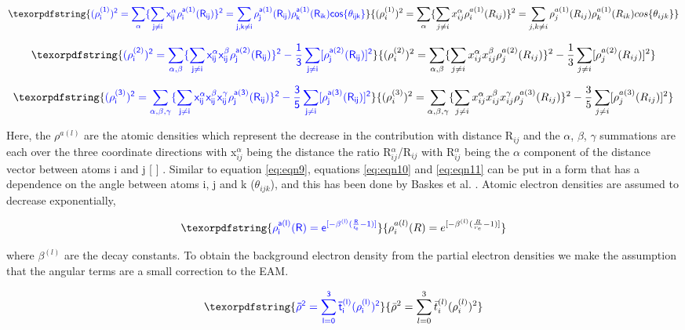 \documentclass[review]{elsarticle}
\providecommand{\DIFaddtex}[1]{{\protect\color{blue} \sf #1}} %
\providecommand{\DIFadd}[1]{\texorpdfstring{\DIFaddtex{#1}}{#1}} %
\begin{document}
\begin{equation}
\DIFadd{\label{eq:eqn9}
(\rho_{i}^{(1)})^{2}=\sum_{\alpha} \{ \sum_{j \neq i}x_{ij}^{\alpha}\rho_{i}^{a(1)}(R_{ij})\}^{2} = \sum_{j,k \neq i}\rho_{j}^{a(1)}(R_{ij})\rho_{k}^{a(1)}(R_{ik})cos\{\theta_{ijk}\}
}\end{equation}

\begin{equation}
\DIFadd{\label{eq:eqn10}
(\rho_{i}^{(2)})^{2}=\sum_{\alpha,\beta}\{\sum_{j \neq i}x_{ij}^{\alpha}x_{ij}^{\beta}\rho_{j}^{a(2)}(R_{ij})\}^{2} - \frac{1}{3}\sum_{j \neq i}[\rho_{j}^{a(2)}(R_{ij})]^2
}\end{equation}

\begin{equation}
\DIFadd{\label{eq:eqn11}
(\rho_{i}^{(3)})^{2}=\sum_{\alpha,\beta,\gamma}\{ \sum_{j \neq i}x_{ij}^{\alpha}x_{ij}^{\beta}x_{ij}^{\gamma}\rho_{j}^{a(3)}(R_{ij}) \}^{2} - \frac{3}{5}\sum_{j \neq i}[\rho_{j}^{a(3)}(R_{ij})]^2
}\end{equation}

\DIFadd{Here, the $\rho^{a(l)}$  are the atomic densities which represent the decrease in the contribution with distance R$_{ij}$ and the $\alpha$, $\beta$, $\gamma$ summations are each over the three coordinate directions with x$_{ij}^{\alpha}$ being the distance the ratio R$_{ij}^{\alpha}$/R$_{ij}$ with R$_{ij}^{\alpha}$ being the $\alpha$ component of the distance vector between atoms i and j }[\DIFadd{29}]\DIFadd{.  Similar to equation \ref{eq:eqn9}, equations \ref{eq:eqn10} and \ref{eq:eqn11} can be put in a form that has a dependence on the angle between atoms i, j and k ($\theta_{ijk}$), and this has been done by Baskes et al. \cite{baskes1989}.  Atomic electron densities are assumed to decrease exponentially, 
}

\begin{equation}
\DIFadd{\label{eq:eqn12}
\rho_{i}^{a(l)}(R) = e^{[-\beta^{(l)}(\frac{R}{r_{e}}-1)]}
}\end{equation}

\DIFadd{where $\beta^{(l)}$ are the decay constants.  To obtain the background electron density from the partial electron densities we make the assumption that the angular terms are a small correction to the EAM.
}

\begin{equation}
\DIFadd{\label{eq:eqn13}
\bar{\rho}^{2} = \sum_{l=0}^{3}\bar{t}_{i}^{(l)} (\rho_{i}^{(l)})^{2}
}\end{equation}
\end{document}
